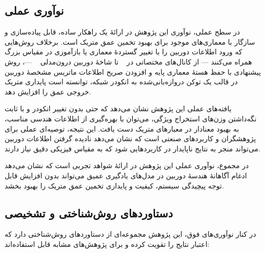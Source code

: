 \subsection{نوآوری عملی}
\label{subsec:practical_novelty}

در سطح عملی،
نوآوری این پژوهش
در ارائهٔ یک راهکار ساده، قابل پیاده‌سازی
و سازگار با معماری‌های موجود
برای بهبود تخمین عمق متریک است.
برخلاف روش‌هایی که ورود اطلاعات دوربین را با تغییر گستردهٔ معماری یا
بازآموزی در مقیاس بزرگ همراه می‌کنند --- از کانال‌های مختصاتی در
~\cite{Facil2019CAMConvs} تا شاخهٔ دوربین درون‌مدلی
~\cite{Piccinelli2024UniDepth} ---،
روش پیشنهادی با حفظ هستهٔ معماری پایه
و افزودن صریح اطلاعات ماتریس مشخصهٔ دوربین
در قالب یک توکن دروازه‌بانی‌شده به انکودر شبکه،
توانسته است پایداری متریک خروجی عمق را افزایش دهد.

یافته‌های عملی این پژوهش
نشان می‌دهد که
حتی بدون تغییر انکودر
و با ثابت نگه‌داشتن وزن‌های استخراج ویژگی،
می‌توان با بهره‌گیری از اطلاعات هندسی مناسب،
به بهبود معنادار در معیارهای متریک دست یافت.
این نتیجه،
توصیه‌ای عملی برای پژوهشگران و کاربردهای صنعتی است
که نشان می‌دهد
نادیده گرفتن اطلاعات دوربین
می‌تواند منجر به نتایج ناپایدار
در کاربردهایی شود
که به مقیاس فیزیکی دقیق نیاز دارند.

در مجموع،
نوآوری عملی این پژوهش
در ارائهٔ شواهد تجربی است
که نشان می‌دهد
ادغام آگاهانهٔ هندسهٔ دوربین
در مدل‌های یادگیری عمیق
می‌تواند بدون افزایش قابل توجه پیچیدگی سیستم،
کیفیت و پایداری تخمین عمق متریک را بهبود بخشد.

\subsection{دستاوردهای روش‌شناختی و تشخیصی}
\label{subsec:methodological_contributions}

در کنار نوآوری‌های فوق، این پژوهش مجموعه‌ای از دستاوردهای روش‌شناختی
دارد که اعتبار نتایج را تقویت کرده و برای پژوهش‌های مشابه قابل استفاده‌اند:

